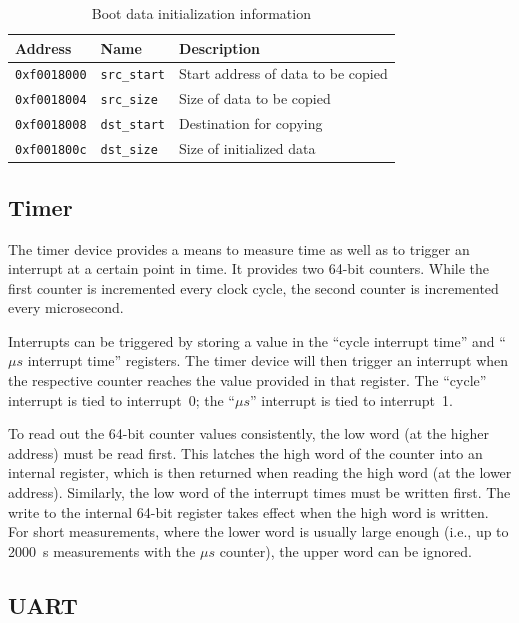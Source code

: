 \documentclass[a4paper,fontsize=10pt,twoside,DIV15,BCOR12mm,headinclude=true,footinclude=false,pagesize,bibtotoc]{scrbook}
\newcommand{\code}[1]{{\texttt{#1}}}
\begin{document}
\begin{table}
\centering
\begin{tabular}{lll}
\toprule
Address & Name & Description \\
\midrule
\code{0xf0018000} & \code{src\_start} & Start address of data to be copied \\
\code{0xf0018004} & \code{src\_size} & Size of data to be copied \\
\code{0xf0018008} & \code{dst\_start} & Destination for copying \\
\code{0xf001800c} & \code{dst\_size} & Size of initialized data \\
\bottomrule
\end{tabular}
\caption{Boot data initialization information}
\label{tab:bootrommap}
\end{table}

\subsection{Timer}

The timer device provides a means to measure time as well as to
trigger an interrupt at a certain point in time. It provides two
64-bit counters. While the first counter is incremented every clock
cycle, the second counter is incremented every microsecond.

Interrupts can be triggered by storing a value in the ``cycle
interrupt time'' and ``$\mu s$ interrupt time'' registers. The timer
device will then trigger an interrupt when the respective counter
reaches the value provided in that register. The ``cycle'' interrupt
is tied to interrupt~0; the ``$\mu s$'' interrupt is tied to
interrupt~1.

To read out the 64-bit counter values consistently, the low word (at
the higher address) must be read first. This latches the high word of
the counter into an internal register, which is then returned when
reading the high word (at the lower address). Similarly, the low word
of the interrupt times must be written first. The write to the
internal 64-bit register takes effect when the high word is written.
For short measurements, where the lower word is usually large enough
(i.e., up to 2000~s measurements with the $\mu s$ counter), the upper
word can be ignored.

\subsection{UART}
\end{document}
